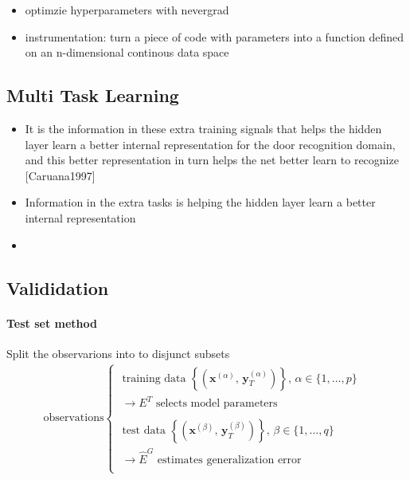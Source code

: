 \documentclass{article}
\begin{document}
\begin{itemize}
\item optimzie hyperparameters with nevergrad
\item instrumentation: turn a piece of code with parameters into a function defined on an n-dimensional continous data space
\end{itemize}


\subsection{Multi Task Learning}

\begin{itemize}
\item It is the information in these extra training signals that helps the hidden layer learn a better internal representation for the door recognition domain, and this better representation in turn helps the net better learn to recognize [Caruana1997]
\item Information in the extra tasks is helping the hidden layer learn a better internal representation
\item 
\end{itemize}



\subsection{Valididation}

\paragraph{Test set method} Split the observarions into to disjunct subsets 
\begin{align*}
\text{observations}
\begin{cases}
	\text{ training data } \left\{ \left(\mathbf x^{(\alpha)}, \,\mathbf y_T^{(\alpha)}\right) \right \}, \, \alpha \in \{1,\dots, p\} & \\	
	\;\rightarrow E^T \text{ selects model parameters} & \\	 \\
	\text{ test data } \left\{ \left(\mathbf x^{(\beta)}, \,\mathbf y_T^{(\beta)}\right) \right \}, \, \beta \in \{1,\dots, q\} & \\	
	\;\rightarrow \widehat{E}^G \text{ estimates generalization error} & \\	
\end{cases}
\end{align*} 
\end{document}
